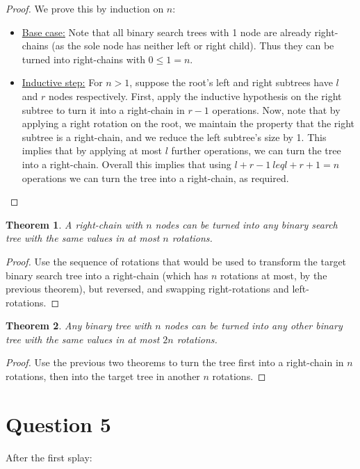 \documentclass[a4paper,11pt]{scrartcl}
\newtheorem{theorem}{Theorem}
\begin{document}
\begin{proof}
    We prove this by induction on $n$:
    \begin{itemize}
        \item \underline{Base case:} Note that all binary search trees with 1 node are already right-chains (as the sole node has neither left or right child). Thus they can be turned into right-chains with $0 \leq 1 = n$.
        \item \underline{Inductive step:} For $n > 1$, suppose the root's left and right subtrees have $l$ and $r$ nodes respectively. First, apply the inductive hypothesis on the right subtree to turn it into a right-chain in $r-1$ operations. Now, note that by applying a right rotation on the root, we maintain the property that the right subtree is a right-chain, and we reduce the left subtree's size by 1. This implies that by applying at most $l$ further operations, we can turn the tree into a right-chain. Overall this implies that using $l + r - 1 \ leq l + r + 1 = n$ operations we can turn the tree into a right-chain, as required.
    \end{itemize}
\end{proof}
\begin{theorem}
    A right-chain with $n$ nodes can be turned into any binary search tree with the same values in at most $n$ rotations.
\end{theorem}
\begin{proof}
    Use the sequence of rotations that would be used to transform the target binary search tree into a right-chain (which has $n$ rotations at most, by the previous theorem), but reversed, and swapping right-rotations and left-rotations.
\end{proof}

\begin{theorem}
    Any binary tree with $n$ nodes can be turned into any other binary tree with the same values in at most $2n$ rotations.
\end{theorem}
\begin{proof}
    Use the previous two theorems to turn the tree first into a right-chain in $n$ rotations, then into the target tree in another $n$ rotations.
\end{proof}

\section*{Question 5}
After the first splay:
\end{document}
